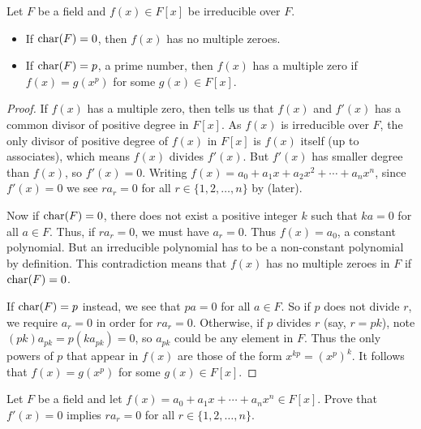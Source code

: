 \begin{theorem}\label{thrm-zeroes-of-an-irreducible}
    Let $F$ be a field and $f(x) \in F[x]$ be irreducible over $F$.
    \begin{itemize}
        \item If $\mathrm{char}(F) = 0$, then $f(x)$ has no multiple zeroes.
        \item If $\mathrm{char}(F) = p$, a prime number, then $f(x)$ has a multiple zero if $f(x) = g(x^p)$ for some $g(x) \in F[x]$.
    \end{itemize}
\end{theorem}
\begin{proof}
    If $f(x)$ has a multiple zero, then  tells us that $f(x)$ and $f'(x)$ has a common divisor of positive degree in $F[x]$. As $f(x)$ is irreducible over $F$, the only divisor of positive degree of $f(x)$ in $F[x]$ is $f(x)$ itself (up to associates), which means $f(x)$ divides $f'(x)$. But $f'(x)$ has smaller degree than $f(x)$, so $f'(x) = 0$. Writing $f(x) = a_0 + a_1x + a_2x^2 + \cdots + a_nx^n$, since $f'(x) = 0$ we see $ra_r = 0$ for all $r \in \{1, 2, \dots, n\}$ by  (later).

    Now if $\mathrm{char}(F) = 0$, there does not exist a positive integer $k$ such that $ka = 0$ for all $a \in F$. Thus, if $ra_r = 0$, we must have $a_r = 0$. Thus $f(x) = a_0$, a constant polynomial. But an irreducible polynomial has to be a non-constant polynomial by definition. This contradiction means that $f(x)$ has no multiple zeroes in $F$ if $\mathrm{char}(F) = 0$.

    If $\mathrm{char}(F) = p$ instead, we see that $pa = 0$ for all $a \in F$. So if $p$ does not divide $r$, we require $a_r = 0$ in order for $ra_r = 0$. Otherwise, if $p$ divides $r$ (say, $r = pk$), note $(pk)a_{pk} = p(ka_{pk}) = 0$, so $a_{pk}$ could be any element in $F$. Thus the only powers of $p$ that appear in $f(x)$ are those of the form $x^{kp} = \left(x^p\right)^k$. It follows that $f(x) = g(x^p)$ for some $g(x) \in F[x]$.
\end{proof}

\begin{exercise}\label{exercise-derivative-is-zero-implies-higher-terms-are-zero}
    Let $F$ be a field and let $f(x) = a_0 + a_1x + \cdots + a_nx^n \in F[x]$. Prove that $f'(x) = 0$ implies $ra_r = 0$ for all $r \in \{1, 2, \dots, n\}$.
\end{exercise}

